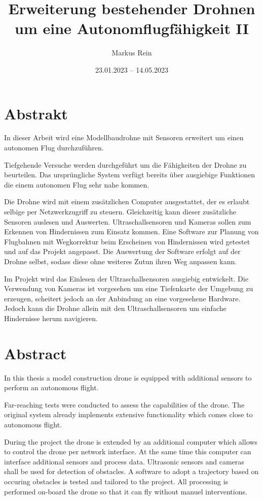 \documentclass[ a4paper,
                oneside,
                toc=bibliography,
                toc=listof
                ]{scrbook}
\author{Markus Rein}
\title{Erweiterung bestehender Drohnen um eine Autonomflugfähigkeit II}
\date{23.01.2023 -- 14.05.2023}
\begin{document}
    \frontmatter
    \makeISWtitle
    
    \cleardoublepage
	\setcounter{page}{1} %
    \declarationOfOriginality

\chapter*{Abstrakt}
In dieser Arbeit wird eine Modellbaudrohne mit Sensoren erweitert um einen autonomen Flug durchzuführen.

Tiefgehende Versuche werden durchgeführt um die Fähigkeiten der Drohne zu beurteilen. Das ursprüngliche System verfügt bereits über ausgiebige Funktionen die einem autonomen Flug sehr nahe kommen.

Die Drohne wird mit einem zusätzlichen Computer ausgestattet, der es erlaubt selbige per Netzwerkzugriff zu steuern. Gleichzeitig kann dieser zusätzliche Sensoren auslesen und Auswerten. Ultraschallsensoren und Kameras sollen zum Erkennen von Hindernissen zum Einsatz kommen. Eine Software zur Planung von Flugbahnen mit Wegkorrektur beim Erscheinen von Hindernissen wird getestet und auf das Projekt angepasst. Die Auswertung der Software erfolgt auf der Drohne selbst, sodass diese ohne weiteres Zutun ihren Weg anpassen kann.

Im Projekt wird das Einlesen der Ultraschallsensoren ausgiebig entwickelt. Die Verwendung von Kameras ist vorgesehen um eine Tiefenkarte der Umgebung zu erzeugen, scheitert jedoch an der Anbindung an eine vorgesehene Hardware. Jedoch kann die Drohne allein mit den Ultraschallsensoren um einfache Hindernisse herum navigieren. 

\chapter*{Abstract}
In this thesis a model construction drone is equipped with additional sensors to perform an autonomous flight.

Far-reaching tests were conducted to assess the capabilities of the drone. The original system already implements extensive functionality which comes close to autonomous flight.

During the project the drone is extended by an additional computer which allows to control the drone per network interface. At the same time this computer can interface additional sensors and process data. Ultrasonic sensors and cameras shall be used for detection of obstacles. A software to adopt a trajectory based on occuring obstacles is tested and tailored to the project. All processing is performed on-board the drone so that it can fly without manuel interventions.
\end{document}
